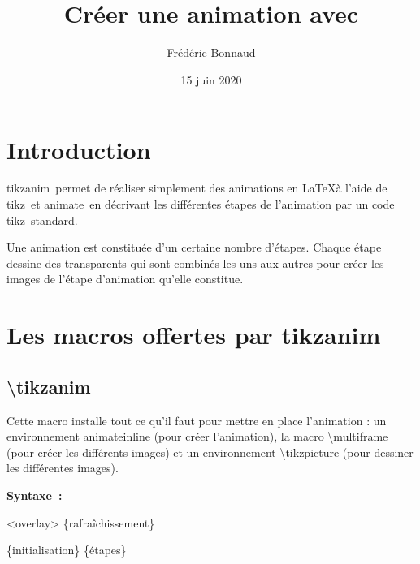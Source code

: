 \documentclass[a4paper,12pt]{article}
\author{Frédéric Bonnaud}%
\title{\TikzAnimate\\ Créer une animation avec \Tikz}
\date{15 juin 2020}
\newcommand\Tikz{{\ttfamily tikz}}
\newcommand\TikzAnimate{{\ttfamily tikzanim}}
\newcommand\Animate{{\ttfamily animate}}
\begin{document}
\maketitle

\tableofcontents

\section{Introduction}

\TikzAnimate\ permet de réaliser simplement des animations en \LaTeX à l'aide de \Tikz\ et \Animate\ en décrivant les différentes étapes de l'animation par un code \Tikz\ standard.

Une animation est constituée d'un certaine nombre d'étapes. Chaque étape dessine des transparents qui sont combinés les uns aux autres pour créer les images de l'étape d'animation qu'elle constitue.


\section{Les macros offertes par \TikzAnimate}

\subsection{\ttfamily\textbackslash tikzanim}

	Cette macro installe tout ce qu'il faut pour mettre en place l'animation : un environnement {\ttfamily animateinline} (pour créer l'animation), la macro {\ttfamily\textbackslash multiframe} (pour créer les différents images) et un environnement {\ttfamily\textbackslash tikzpicture} (pour dessiner les différentes images).
	
	\textbf{Syntaxe~:} 
	
	 {\ttfamily <overlay>} {} {\ttfamily \{rafraîchissement\}}
	
	{} {\ttfamily \{initialisation\}} {\ttfamily \{étapes\}}
	
\end{document}
